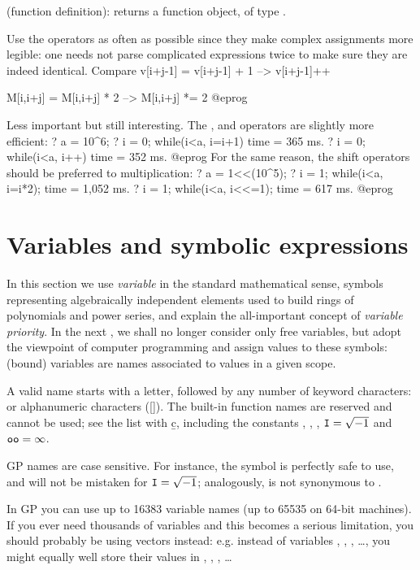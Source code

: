 \kbd{->} (function definition):  returns a
function object, of type .

 Use the \kbd{=} operators as often as possible
since they make complex assignments more legible: one needs not parse
complicated expressions twice to make sure they are indeed identical. Compare
\bprog
v[i+j-1] = v[i+j-1] + 1    -->    v[i+j-1]++

M[i,i+j] = M[i,i+j] * 2    -->    M[i,i+j] *= 2
@eprog

 Less important but still interesting. The
\kbd{++}, \kbd{--} and \kbd{=} operators are slightly more efficient:
\bprog
? a = 10^6;
? i = 0; while(i<a, i=i+1)
time = 365 ms.
? i = 0; while(i<a, i++)
time = 352 ms.
@eprog
\noindent For the same reason, the shift operators should be preferred to
multiplication:
\bprog
? a = 1<<(10^5);
? i = 1; while(i<a, i=i*2);
time = 1,052 ms.
? i = 1; while(i<a, i<<=1);
time = 617 ms.
@eprog

\section{Variables and symbolic expressions}\label{se:varsymb}
In this section we use \emph{variable} in the standard mathematical
sense, symbols representing algebraically independent elements used to build
rings of polynomials and power series, and explain the all-important concept
of \emph{variable priority}. In the next , we shall no
longer consider only free variables, but adopt the viewpoint of computer
programming and assign values to these symbols: (bound) variables are names
associated to values in a given scope.

\label{se:varname} A valid name starts with a letter,
followed by any number of keyword characters: \kbd{\_} or alphanumeric
characters ([]). The built-in function names are reserved and
cannot be used; see the list with \b{c}, including the constants ,
, , ${\tt I}=\sqrt{-1}$ and ${\tt oo} = \infty$.

GP names are case sensitive. For instance, the symbol  is perfectly
safe to use, and will not be mistaken for ${\tt I} = \sqrt{-1}$; analogously,
 is not synonymous to .

In GP you can use up to 16383 variable names (up to 65535 on 64-bit
machines). If you ever need thousands of variables and this becomes a serious
limitation, you should probably be using vectors instead: e.g. instead of
variables , , , \dots, you might equally well store
their values in , , , \dots

